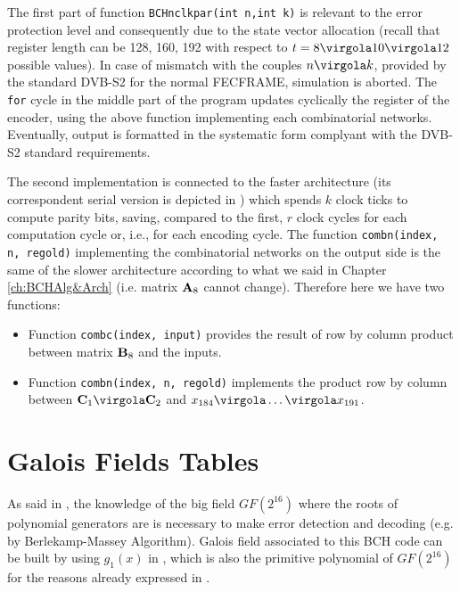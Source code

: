 

The first part of function \texttt{BCHnclkpar(int n,int k)} is relevant to the error protection level and consequently due to the state vector allocation (recall that register length can be 128, 160, 192 with respect to \(t = 8 \virgola 10 \virgola 12\) possible values). In case of mismatch with the couples \(n \virgola k\), provided by the standard DVB-S2 for the normal FECFRAME, simulation is aborted.
The \texttt{for} cycle in the middle part of the program updates cyclically the register of the encoder, using the above function implementing each combinatorial networks. %
Eventually, output is formatted in the systematic form complyant with the DVB-S2 standard requirements.




The second implementation is connected to the faster architecture (its correspondent serial version is depicted in ) which spends \(k\) clock ticks to compute parity bits, saving, compared to the first, \(r\) clock cycles for each computation cycle or, i.e., for each encoding cycle. The function \texttt{combn(index, n, regold)} implementing the combinatorial networks on the output side is the same of the slower architecture according to what we said in Chapter \ref{ch:BCHAlg&Arch} (i.e. matrix \(\mathbf{A}_8 \) cannot change).
Therefore here we have two functions:
\begin{itemize}
\item Function \texttt{combc(index, input)} provides the result of row by column product between matrix \(\mathbf{B}_8\) and the inputs.
\item  Function \texttt{combn(index, n, regold)} implements the product row by column between \(\vet C_1 \virgola \vet C_2\) and \(x_{184}\virgola \ldots \virgola x_{191}\).
\end{itemize}





\section{Galois Fields Tables}

As said in , the knowledge of the big field \(GF(2^{16})\) where the roots of polynomial generators are is necessary to make error detection and decoding (e.g. by Berlekamp-Massey Algorithm). Galois field associated to this BCH code can be built by using \(g_1(x)\) in , which is also the primitive polynomial of \(GF(2^{16})\) for the reasons already expressed in .

